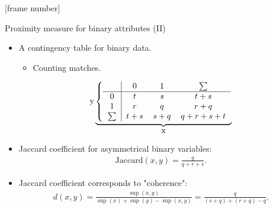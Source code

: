 \documentclass[aspectratio=169,t]{beamer}
\begin{document}
  {
    [frame number]
    \begin{frame}{Proximity measure for binary attributes (II)}
    \begin{itemize}
      \item A contingency table for binary data.
      \begin{itemize}
        \item Counting matches.
      \end{itemize}
      \begin{center}
        \vspace{-0.2cm}
        \[
        \text{y}\underbrace{
        \left\{\begin{tabular}{ c | c c c }
         & $0$ & $1$ & $\sum$ \\ \hline
         $0$ & $t$ & $s$ & $t+s$\\
         $1$ & $r$ & $q$ & $r+q$\\
         $\sum$ & $t+s$ & $s+q$ & $q+r+s+t$
        \end{tabular}\right.}_{\let\scriptstyle\textstyle\substack{\text{x}}}
        \]
      \end{center}
      \item Jaccard coefficient for asymmetrical binary variables:
      \begin{align}
        \text{Jaccard}(x,y) = \frac{q}{q+r+s}.
      \end{align}
      \item Jaccard coefficient corresponds to "coherence":
      \begin{align}
        d(x,y) = \frac{\sup(x,y)}{\sup(x) + \sup(y) - \sup(x,y)} = \frac{q}{(s+q)+(r+q)-q}.
      \end{align}
    \end{itemize}
    \end{frame}
  }
\end{document}
